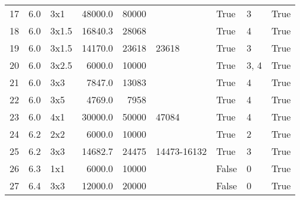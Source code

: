 \begin{center}
\begin{tabular}{l | c | l | r r l | l l | l }
        17  & 6.0    & 3x1      & 48000.0 & 80000       & ~            & True     & 3      & True   \\ 
        18  & 6.0    & 3x1.5    & 16840.3 & 28068       & ~            & True     & 4      & True   \\ 
        19  & 6.0    & 3x1.5    & 14170.0 & 23618       & 23618        & True     & 3      & True   \\ 
        20  & 6.0    & 3x2.5    &  6000.0 & 10000       & ~            & True     & 3, 4   & True   \\ 
        21  & 6.0    & 3x3      &  7847.0 & 13083       & ~            & True     & 4      & True   \\ 
        22  & 6.0    & 3x5      &  4769.0 &  7958       & ~            & True     & 4      & True   \\ 
        23  & 6.0    & 4x1      & 30000.0 & 50000       & 47084        & True     & 4      & True   \\ 
        24  & 6.2    & 2x2      &  6000.0 & 10000       & ~            & True     & 2      & True   \\ 
        25  & 6.2    & 3x3      & 14682.7 & 24475       & 14473-16132  & True     & 3      & True   \\ 
        26  & 6.3    & 1x1      &  6000.0 & 10000       & ~            & False    & 0      & True   \\ 
        27  & 6.4    & 3x3      & 12000.0 & 20000       & ~            & False    & 0      & True   \\ 
    \end{tabular}
    \label{tab:parametersTime}
\end{center}

\newpage

